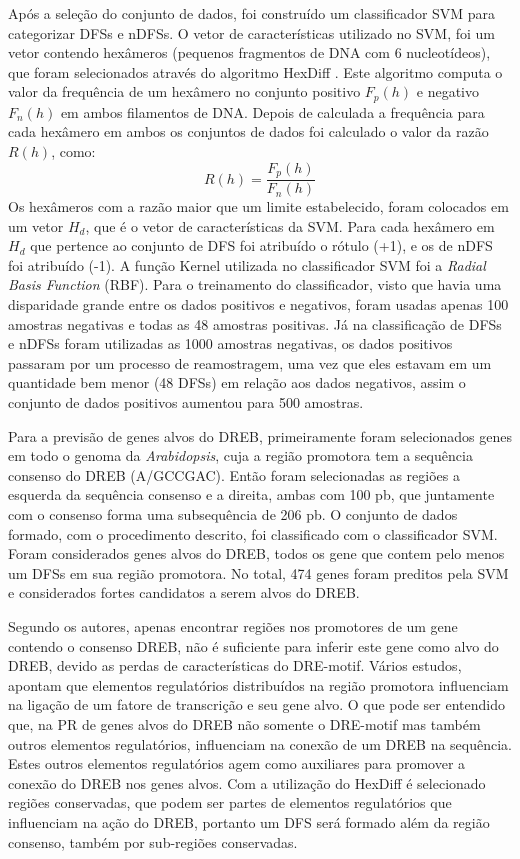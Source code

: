 Após a seleção do conjunto de dados, foi construído um classificador SVM para categorizar DFSs e nDFSs. O vetor de características utilizado no SVM, foi um vetor contendo hexâmeros (pequenos fragmentos de DNA com 6 nucleotídeos), que foram selecionados através do algoritmo HexDiff \cite{Chan2005}. Este algoritmo computa o valor da frequência de um hexâmero no conjunto positivo $F_{p}(h)$ e negativo $F_{n}(h)$ em ambos filamentos de DNA. Depois de calculada a frequência para cada hexâmero em ambos os conjuntos de dados foi calculado o valor da razão $R(h)$, como:
\begin{equation}
R(h) = \frac{F_{p}(h)}{F_{n}(h)}
\end{equation}
Os hexâmeros com a razão maior que um limite estabelecido, foram colocados em um vetor $H_{d}$, que é o vetor de características da SVM. Para cada hexâmero em $H_{d}$ que pertence ao conjunto de DFS foi atribuído o rótulo (+1), e os de nDFS foi atribuído (-1). A função Kernel utilizada no classificador SVM foi a \textit{Radial Basis Function}   (RBF). Para o treinamento do classificador, visto que havia uma disparidade grande entre os dados positivos e negativos, foram usadas apenas 100 amostras negativas e todas as 48 amostras positivas. Já na classificação de DFSs e nDFSs foram utilizadas as 1000 amostras negativas, os dados positivos passaram por um processo de reamostragem, uma vez que eles estavam em um quantidade bem menor (48 DFSs) em relação aos dados negativos, assim o conjunto de dados positivos aumentou para 500 amostras.

Para a previsão de genes alvos do DREB, primeiramente foram selecionados genes em todo o genoma da \textit{Arabidopsis}, cuja a região promotora tem a sequência consenso do DREB (A/GCCGAC). Então foram selecionadas as regiões a esquerda da sequência consenso e a direita, ambas com 100 pb, que juntamente com o consenso forma uma subsequência de 206 pb. O conjunto de dados formado, com o procedimento descrito, foi classificado com o classificador SVM. Foram considerados genes alvos do DREB, todos os gene que contem  pelo menos um DFSs em sua região promotora. No total, 474 genes foram preditos pela SVM e considerados fortes candidatos a serem alvos do DREB.

Segundo os autores, apenas encontrar regiões nos promotores de um gene contendo o consenso DREB, não é suficiente para inferir este gene como alvo do DREB, devido as perdas de características do DRE-motif. Vários estudos, apontam que elementos regulatórios distribuídos na região promotora influenciam na ligação de um fatore de transcrição e seu gene alvo. O que pode ser entendido que, na PR de genes alvos do DREB não somente o DRE-motif mas também outros elementos regulatórios, influenciam na conexão de um DREB na sequência. Estes outros elementos regulatórios agem como auxiliares para promover a conexão do DREB nos genes alvos. Com a utilização do HexDiff é selecionado regiões conservadas, que podem ser partes de elementos regulatórios que influenciam na ação do DREB, portanto um DFS será formado além da região consenso, também por sub-regiões conservadas.

